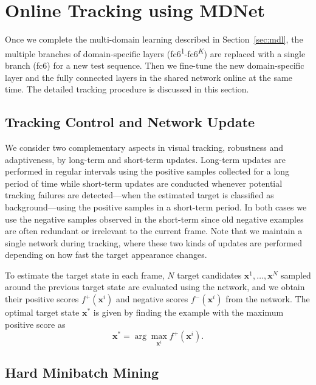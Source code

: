 \documentclass[10pt,twocolumn,letterpaper]{article}
\begin{document}
\section{Online Tracking using MDNet}
\label{sec:online}
Once we complete the multi-domain learning described in Section~\ref{sec:mdl}, the multiple branches of domain-specific layers (fc6\textsuperscript{1}-fc6\textsuperscript{$K$}) are replaced with a single branch (fc6) for a new test sequence. 
Then we fine-tune the new domain-specific layer and the fully connected layers in the shared network online at the same time.
The detailed tracking procedure is discussed in this section.

\subsection{Tracking Control and Network Update}
We consider two complementary aspects in visual tracking, robustness and adaptiveness, by long-term and short-term updates.
Long-term updates are performed in regular intervals using the positive samples collected for a long period of time while short-term updates are conducted whenever potential tracking failures are detected---when the estimated target is classified as background---using the positive samples in a short-term period.
In both cases we use the negative samples observed in the short-term since old negative examples are often redundant or irrelevant to the current frame.
Note that we maintain a single network during tracking, where these two kinds of updates are performed depending on how fast the target appearance changes.

To estimate the target state in each frame, $N$ target candidates $\mathbf{x}^1,\dots,\mathbf{x}^N$ sampled around the previous target state are evaluated using the network, and we obtain their positive scores $f^+(\mathbf{x}^i)$ and negative scores $f^-(\mathbf{x}^i)$ from the network. 
The optimal target state $\mathbf{x}^*$ is given by finding the example with the maximum positive score as
\begin{equation}
\label{eq:target}
\mathbf{x}^* = \arg\!\max_{\mathbf{x}^i} f^+(\mathbf{x}^i).
\end{equation}

\subsection{Hard Minibatch Mining}
\end{document}
